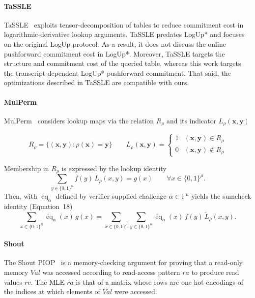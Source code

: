 \paragraph{TaSSLE}

TaSSLE~\cite{cryptoeprint:2024/1075} exploits tensor-decomposition of tables to reduce commitment cost 
in logarithmic-derivative lookup arguments. TaSSLE predates LogUp* and focuses on the original LogUp
protocol. As a result, it does not discuss the online pushforward commitment cost in LogUp*. 
Moreover, TaSSLE targets the structure and commitment cost of the queried table, whereas this work 
targets the transcript-dependent LogUp* pushforward commitment. That said, the optimizations described 
in TaSSLE are compatible with ours.

\paragraph{MulPerm}


MulPerm~\cite{cryptoeprint:2025/1850} considers lookup maps via the relation \(R_\rho\) and its indicator 
\(L_\rho(\mathbf{x}, \mathbf{y})\)

\[
R_\rho = \{(\mathbf{x}, \mathbf{y}) : \rho(\mathbf{x}) = \mathbf{y} \}
\qquad
L_\rho(\mathbf{x}, \mathbf{y}) =
\begin{cases}
1 & (\mathbf{x}, \mathbf{y}) \in R_\rho \\
0 & (\mathbf{x}, \mathbf{y}) \notin R_\rho
\end{cases}
\]

Membership in \(R_\rho\) is expressed by the lookup identity
\[
\sum_{y\in\{0,1\}^{\kappa}} f(y)\,L_\rho(x,y)=g(x)
\qquad\forall x\in\{0,1\}^{\mu}.
\]
Then, with \(\widetilde{\operatorname{eq}}_\alpha\) defined by verifier supplied challenge 
\(\alpha\in\mathbb{F}^{\mu}\) yields the sumcheck identity (Equation~18)
\[
\sum_{x\in\{0,1\}^{\mu}}
\widetilde{\operatorname{eq}}_\alpha(x)\,g(x)
=
\sum_{x\in\{0,1\}^{\mu}}
\sum_{y\in\{0,1\}^{\kappa}}
\widetilde{\operatorname{eq}}_\alpha(x)\,f(y)\,\widetilde{L}_\rho(x,y).
\]

\paragraph{Shout}

The Shout PIOP~\cite{cryptoeprint:2025/105} is a memory-checking argument 
for proving that a read-only memory \(Val\) was accessed according to 
read-access pattern \(ra\) to produce read values \(rv\).
The MLE \(\widetilde{ra}\) is that of a matrix whose rows are one-hot encodings of the 
indices at which elements of \(Val\) were accessed.

